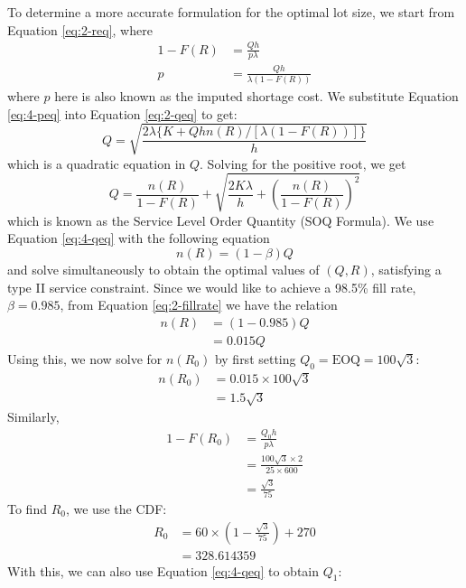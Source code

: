 \documentclass[12pt]{article}
\begin{document}
To determine a more accurate formulation for the optimal lot size, we start from Equation \ref{eq:2-req}, where \begin{align}\nonumber
    1- F(R) &= \frac{Qh}{p\lambda} \\ \label{eq:4-peq}
    p &= \frac{Qh}{\lambda(1-F(R))}
\end{align} where $p$ here is also known as the imputed shortage cost. We substitute Equation \ref{eq:4-peq} into Equation \ref{eq:2-qeq} to get: \begin{equation*}
    Q = \sqrt{ \frac{2\lambda \{K + Qhn(R) / [\lambda(1-F(R))]\}}{h}}
\end{equation*} which is a quadratic equation in $Q$. Solving for the positive root, we get \begin{equation}\label{eq:4-qeq}
    Q = \frac{n(R)}{1 - F(R)} + \sqrt{ \frac{2 K\lambda }{h} + \left( \frac{n(R)}{1-F(R)} \right)^{2}}
\end{equation} which is known as the Service Level Order Quantity (SOQ Formula). We use Equation \ref{eq:4-qeq} with the following equation \begin{equation}\label{eq:4-nreq}
    n(R) = (1-\beta)Q 
\end{equation} and solve simultaneously to obtain the optimal values of $(Q,R)$, satisfying a type II service constraint. Since we would like to achieve a 98.5\% fill rate, $\beta = 0.985$, from Equation \ref{eq:2-fillrate} we have the relation \begin{align*}
    n(R) &= (1-0.985)Q \\ 
    &= 0.015Q
\end{align*} Using this, we now solve for $n(R_{0})$ by first setting $Q_{0} = \text{EOQ} = 100\sqrt{3}$: \begin{align*}
    n(R_{0}) &= 0.015 \times 100\sqrt{3} \\ 
    &= 1.5\sqrt{3}
\end{align*} Similarly, \begin{align*}
    1-F(R_{0}) &= \frac{Q_{0} h}{p\lambda} \\
    &= \frac{100\sqrt{3}\times 2}{25 \times 600} \\ 
    &= \frac{\sqrt{3}}{75}
\end{align*} To find $R_{0}$, we use the CDF: \begin{align*}
    R_{0} &= 60 \times \left( 1- \frac{\sqrt{3}}{75} \right) + 270 \\ 
    &= 328.614359
\end{align*} With this, we can also use Equation \ref{eq:4-qeq} to obtain $Q_{1}$: \begin{align*}

\end{align*}
\end{document}
